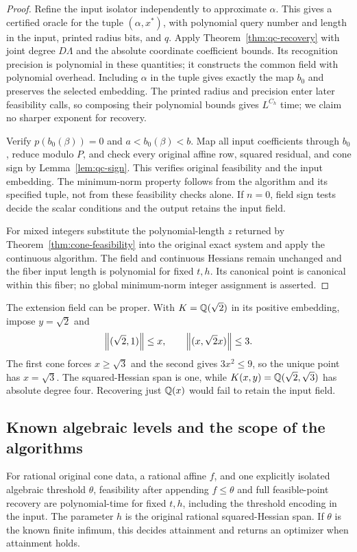\begin{proof}
Refine the input isolator independently to approximate $\alpha$. This
gives a certified oracle for the tuple $(\alpha,x^*)$, with polynomial
query number and length in the input, printed radius bits, and $q$.
Apply Theorem~\ref{thm:qc-recovery} with joint degree $D\Lambda$ and
the absolute coordinate coefficient bounds. Its recognition precision is
polynomial in these quantities; it constructs the common field with
polynomial overhead. Including $\alpha$ in the tuple gives exactly the
map $b_0$ and preserves the selected embedding. The printed radius and
precision enter later feasibility calls, so composing their polynomial
bounds gives $L^{C_h}$ time; we claim no sharper exponent for recovery.

Verify $p(b_0(\beta))=0$ and $a<b_0(\beta)<b$. Map all input
coefficients through $b_0$, reduce modulo $P$, and check every original
affine row, squared residual, and cone sign by Lemma~\ref{lem:qc-sign}.
This verifies original feasibility and the input embedding. The
minimum-norm property follows from the algorithm and its specified tuple,
not from these feasibility checks alone. If $n=0$, field sign tests decide
the scalar conditions and the output retains the input field.

For mixed integers substitute the polynomial-length $z$ returned by
Theorem~\ref{thm:cone-feasibility} into the original exact system and
apply the continuous algorithm. The field and continuous Hessians remain
unchanged and the fiber input length is polynomial for fixed $t,h$.
Its canonical point is canonical within this fiber; no global minimum-norm
integer assignment is asserted.
\end{proof}

The extension field can be proper. With $K=\mathbb Q(\sqrt2)$ in its positive
embedding, impose $y=\sqrt2$ and
\[
 \left\lVert(\sqrt2,1)\right\rVert\le x,\qquad \left\lVert(x,\sqrt2x)\right\rVert\le3.
\]
The first cone forces $x\ge\sqrt3$ and the second gives
$3x^2\le9$, so the unique point has $x=\sqrt3$. The squared-Hessian
span is one, while $K(x,y)=\mathbb Q(\sqrt2,\sqrt3)$ has absolute degree four.
Recovering just $\mathbb Q(x)$ would fail to retain the input field.

\subsection{Known algebraic levels and the scope of the algorithms}
\label{app:cone-levels}

\begin{corollary}
\label{cor:cone-threshold}
For rational original cone data, a rational affine $f$, and one explicitly
isolated algebraic threshold $\theta$, feasibility after appending
$f\le\theta$ and full feasible-point recovery are polynomial-time for
fixed $t,h$, including the threshold encoding in the input. The parameter
$h$ is the original rational squared-Hessian span. If $\theta$ is the
known finite infimum, this decides attainment and returns an optimizer
when attainment holds.
\end{corollary}

